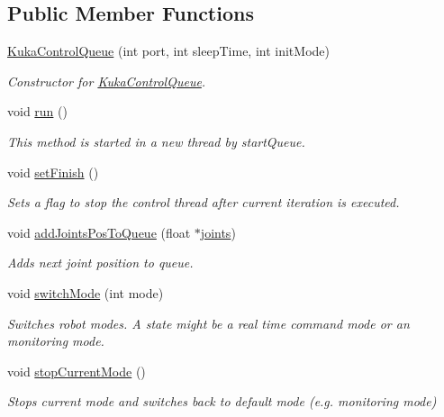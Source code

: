 \subsection*{\-Public \-Member \-Functions}
\begin{DoxyCompactItemize}
\item 
\hyperlink{classKukaControlQueue_ad83b88087dd9cec8c52e3211af54013c}{\-Kuka\-Control\-Queue} (int port, int sleep\-Time, int init\-Mode)
\begin{DoxyCompactList}\small\item\em \-Constructor for \hyperlink{classKukaControlQueue}{\-Kuka\-Control\-Queue}. \end{DoxyCompactList}\item 
void \hyperlink{classKukaControlQueue_ac77a50c65dd633fa18913c45cc6fe26a}{run} ()
\begin{DoxyCompactList}\small\item\em \-This method is started in a new thread by start\-Queue. \end{DoxyCompactList}\item 
void \hyperlink{classKukaControlQueue_aac151fe8a3fb3e2744ea29ef37036754}{set\-Finish} ()
\begin{DoxyCompactList}\small\item\em \-Sets a flag to stop the control thread after current iteration is executed. \end{DoxyCompactList}\item 
void \hyperlink{classKukaControlQueue_a62ccf60f8a53d8d04a14a4d396b3d13a}{add\-Joints\-Pos\-To\-Queue} (float $\ast$\hyperlink{fri__example_8m_a094bd681592faefb6f9be3d22d34cbcd}{joints})
\begin{DoxyCompactList}\small\item\em \-Adds next joint position to queue. \end{DoxyCompactList}\item 
void \hyperlink{classKukaControlQueue_a8bbf6b7c4a0cea73c4e3891d18d51fdf}{switch\-Mode} (int mode)
\begin{DoxyCompactList}\small\item\em \-Switches robot modes. \-A state might be a real time command mode or an monitoring mode. \end{DoxyCompactList}\item 
void \hyperlink{classKukaControlQueue_a33c03e1a8b1e5fef533a6cdaca9fe15d}{stop\-Current\-Mode} ()
\begin{DoxyCompactList}\small\item\em \-Stops current mode and switches back to default mode (e.\-g. monitoring mode) \end{DoxyCompactList}\item 

\end{DoxyCompactItemize}
